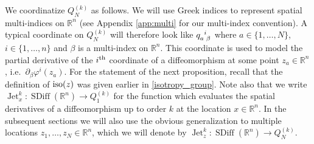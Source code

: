 \documentclass[12pt]{amsart}
\newcommand{\R}{\ensuremath{\mathbb{R}}}
\DeclareMathOperator{\SDiff}{SDiff}
\DeclareMathOperator{\Jet}{Jet}
\begin{document}
  We coordinatize $Q^{(k)}_N$ as follows.
  We will use Greek indices to represent spatial
  multi-indices on $\R^n$ (see Appendix \ref{app:multi} for our multi-index convention).
  A typical coordinate on $Q^{(k)}_N$ will therefore look
  like $q\indices{_a^i_\beta}$ where $a \in \{1,\dots,N\}$, $i \in \{ 1 , \dots, n \}$
  and $\beta$ is a multi-index on $\R^n$.
  This coordinate is used to model the partial derivative of the $i^{\rm th}$ coordinate
  of a diffeomorphism at some point $z_a \in \R^n$, i.e.\ $\partial_\beta \varphi^i(z_a)$.
  For the statement of the next proposition, recall that the definition  of ${\rm iso}(z)$ was given earlier in \eqref{isotropy_group}. Note also that we write $\Jet^k_x: \SDiff(\R^n) \to Q_1^{(k)}$ for
    the function which evaluates the spatial derivatives
    of a diffeomorphism up to order $k$ at the location $x \in \R^n$. In the subsequent sections we will also use the obvious generalization to multiple locations $z_1, \ldots, z_N \in \R^n$, which we will denote by $\Jet^k_z : \SDiff(\R^n) \to Q_N^{(k)}$.  
\end{document}
